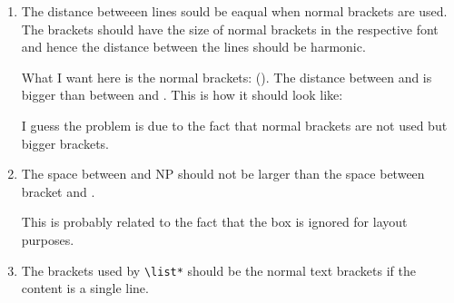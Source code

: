 \documentclass[output=book
		,modfonts
		,nonflat
	        ,collection
	        ,collectionchapter
	        ,collectiontoclongg
 	        ,biblatex  
                ,babelshorthands
                ,newtxmath
                ,colorlinks, citecolor=brown 
                ,draftmode
		  ]{langscibook}
\begin{document}
\begin{enumerate}
\item 
The distance betweeen lines sould be eaqual when normal brackets are used. The brackets should have
the size of normal brackets in the respective font and hence the distance between the lines should
be harmonic.

\ea
{}
\z

What I want here is the normal brackets: (). The distance between \phon and \synsem is bigger than
between \synsem and \dtrs. This is how it should look like:

\ea
{}
\z
I guess the problem is due to the fact that normal brackets are not used but bigger brackets.


\item The space between  and NP should not be larger than the space between bracket and .

\ea
{}
\z

This is probably related to the fact that the box is ignored for layout purposes.

\item The brackets used by \verb+\list*+ should be the normal text brackets if the content is a single
  line.

\ea
{}
\z

\end{enumerate}

\fi
\end{document}

